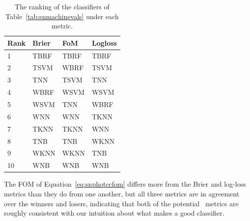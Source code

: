 \begin{table}[]
\begin{tabular}{llll}
Rank & Brier           & FoM             & Logloss       \\
\hline
1 & TBRF	& TBRF 	& TBRF \\
2 & TSVM 	& WBRF	& TSVM \\
3 & TNN 	& TSVM	& TNN \\
4 & WBRF 	& WSVM	& WSVM \\
5 & WSVM 	& TNN		& WBRF \\
6 & WNN 	& WNN		& TKNN \\
7 & TKNN 	& TKNN	& WNN \\
8 & TNB 	& TNB		& WKNN \\
9 & WKNN 	& WKNN	& TNB \\
10 & WNB 	& WNB		& WNB \\
\end{tabular}
\caption{The ranking of the classifiers of Table~\ref{tab:snmachinevals} under each metric.}
\label{tab:snmachinerank}
\end{table}

The FOM of Equation~\ref{eq:snphotccfom} differs more from the Brier and log-loss metrics than they do from one another, but all three metrics are in agreement over the winners and losers, indicating that both of the potential \plasticc\ metrics are roughly consistent with our intuition about what makes a good classifier.

